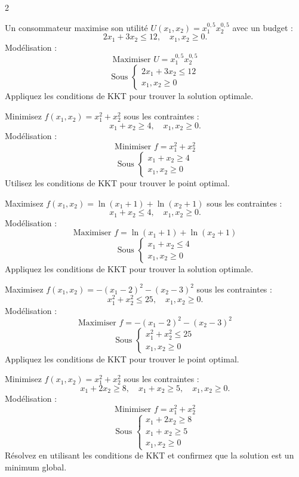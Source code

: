\begin{multicols}{2}
\begin{exo}
	Un consommateur maximise son utilité \( U(x_1, x_2) = x_1^{0,5} x_2^{0,5} \) avec un budget :
	\[
	2x_1 + 3x_2 \leq 12, \quad x_1, x_2 \geq 0.
	\]
	Modélisation :
	\[
	\text{Maximiser } U = x_1^{0,5} x_2^{0,5}
	\]
	\[
	\text{Sous } \begin{cases}
	2x_1 + 3x_2 \leq 12 \\
	x_1, x_2 \geq 0
	\end{cases}
	\]
	Appliquez les conditions de KKT pour trouver la solution optimale.
\end{exo}

\begin{exo}
	Minimisez \( f(x_1, x_2) = x_1^2 + x_2^2 \) sous les contraintes :
	\[
	x_1 + x_2 \geq 4, \quad x_1, x_2 \geq 0.
	\]
	Modélisation :
	\[
	\text{Minimiser } f = x_1^2 + x_2^2
	\]
	\[
	\text{Sous } \begin{cases}
	x_1 + x_2 \geq 4 \\
	x_1, x_2 \geq 0
	\end{cases}
	\]
	Utilisez les conditions de KKT pour trouver le point optimal.
\end{exo}

\begin{exo}
	Maximisez \( f(x_1, x_2) = \ln(x_1 + 1) + \ln(x_2 + 1) \) sous les contraintes :
	\[
	x_1 + x_2 \leq 4, \quad x_1, x_2 \geq 0.
	\]
	Modélisation :
	\[
	\text{Maximiser } f = \ln(x_1 + 1) + \ln(x_2 + 1)
	\]
	\[
	\text{Sous } \begin{cases}
	x_1 + x_2 \leq 4 \\
	x_1, x_2 \geq 0
	\end{cases}
	\]
	Appliquez les conditions de KKT pour trouver la solution optimale.
\end{exo}

\begin{exo}
	Maximisez \( f(x_1, x_2) = -(x_1 - 2)^2 - (x_2 - 3)^2 \) sous les contraintes :
	\[
	x_1^2 + x_2^2 \leq 25, \quad x_1, x_2 \geq 0.
	\]
	Modélisation :
	\[
	\text{Maximiser } f = -(x_1 - 2)^2 - (x_2 - 3)^2
	\]
	\[
	\text{Sous } \begin{cases}
	x_1^2 + x_2^2 \leq 25 \\
	x_1, x_2 \geq 0
	\end{cases}
	\]
	Appliquez les conditions de KKT pour trouver le point optimal.
\end{exo}

\begin{exo}
	Minimisez \( f(x_1, x_2) = x_1^2 + x_2^2 \) sous les contraintes :
	\[
	x_1 + 2x_2 \geq 8, \quad x_1 + x_2 \geq 5, \quad x_1, x_2 \geq 0.
	\]
	Modélisation :
	\[
	\text{Minimiser } f = x_1^2 + x_2^2
	\]
	\[
	\text{Sous } \begin{cases}
	x_1 + 2x_2 \geq 8 \\
	x_1 + x_2 \geq 5 \\
	x_1, x_2 \geq 0
	\end{cases}
	\]
	Résolvez en utilisant les conditions de KKT et confirmez que la solution est un minimum global.
\end{exo}


\end{multicols}
